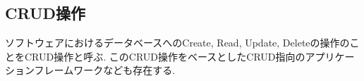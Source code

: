 \documentclass[../../../main]{subfiles}
\begin{document}
    \subsection{CRUD操作}\label{subsec:phraseology-crud}

    ソフトウェアにおけるデータベースへのCreate, Read, Update, Deleteの操作のことをCRUD操作と呼ぶ. このCRUD操作をベースとしたCRUD指向のアプリケーションフレームワークなども存在する. \cite{現場で役立つシステム設計の原則}
\end{document}
